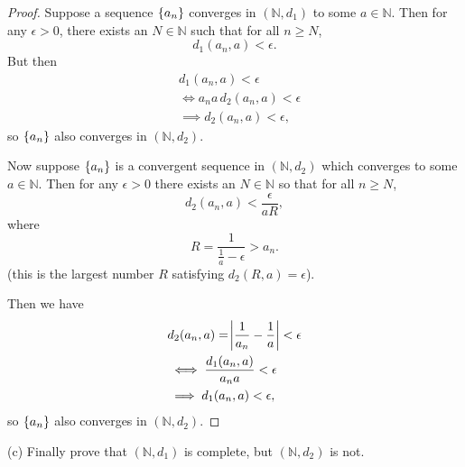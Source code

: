 \documentclass{article}
\newcommand{\N}{\mathbb{N}}
\begin{document}
\begin{proof}

Suppose a sequence $\cbr{a_n}$ converges in $(\N, d_1)$ to some $a \in
\N$. Then for any $\epsilon > 0$, there exists an $N \in \N$ such that
for all $n \geq N$,
%
\begin{equation*}
    d_1(a_n, a) < \epsilon
    .
\end{equation*}
%
But then
%
\begin{align*}
    &d_1(a_n, a) < \epsilon \\
    &\iff a_n a \, d_2(a_n, a) < \epsilon \\
    &\implies d_2(a_n, a) < \epsilon
    ,
\end{align*}
%
so $\cbr{a_n}$ also converges in $(\N, d_2)$.

Now suppose $\cbr{a_n}$ is a convergent sequence in $(\N, d_2)$ which
converges to some $a \in \N$. Then for any $\epsilon > 0$ there exists
an $N \in \N$ so that for all $n \geq N$,
%
\begin{equation*}
    d_2(a_n, a) < \frac{\epsilon}{a R}
    ,
\end{equation*}
%
where
%
\begin{equation*}
    R = \frac{1}{\frac{1}{a} - \epsilon} > a_n
    .
\end{equation*}
%
(this is the largest number $R$ satisfying $d_2(R, a) = \epsilon$).

Then we have
%
\begin{align*}
    &d_2(a_n, a) = \envert{\frac{1}{a_n} - \frac{1}{a} }< \epsilon \\
    &\iff \frac{d_1(a_n, a)}{a_n a} < \epsilon \\
    &\implies d_1(a_n, a) < \epsilon
    ,
\end{align*}
%
so $\cbr{a_n}$ also converges in $(\N, d_2)$.

\end{proof}

\newpage

(c) Finally prove that $(\N, d_1)$ is complete, but $(\N, d_2)$ is not.
\end{document}
